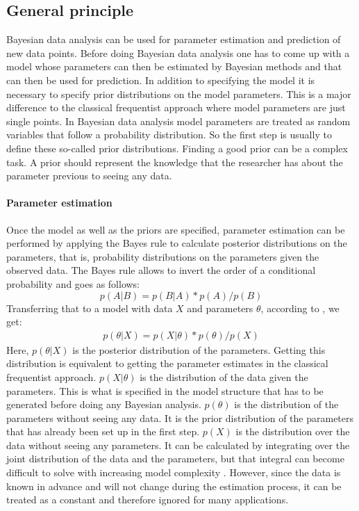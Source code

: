 \documentclass{article}
\begin{document}
\subsection{General principle}
\label{subsec: General principle}
Bayesian data analysis can be used for parameter estimation and prediction of new data points. Before doing Bayesian data analysis one has to come up with a model whose parameters can then be estimated by Bayesian methods and that can then be used for prediction. In addition to specifying the model it is necessary to specify prior distributions on the model parameters. This is a major difference to the classical frequentist approach where model parameters are just single points. In Bayesian data analysis model parameters are treated as random variables that follow a probability distribution. So the first step is usually to define these so-called prior distributions. Finding a good prior can be a complex task. A prior should represent the knowledge that the researcher has about the parameter previous to seeing any data.
\paragraph{Parameter estimation}
Once the model as well as the priors are specified, parameter estimation can be performed by applying the Bayes rule to calculate posterior distributions on the parameters, that is, probability distributions on the parameters given the observed data. The Bayes rule allows to invert the order of a conditional probability and goes as follows:
\begin{equation}
p(A|B) = p(B|A) * p(A)/p(B)
\end{equation}
Transferring that to a model with data $X$ and parameters $\theta$, according to \cite{1439840954}, we get:
\begin{equation}
\label{eq:Bayes_formula}
\begin{split}
p(\theta|X) = p(X|\theta) * p(\theta)/p(X)
\end{split}
\end{equation}
Here, $p(\theta|X)$ is the posterior distribution of the parameters. Getting this distribution is equivalent to getting the parameter estimates in the classical frequentist approach. $p(X|\theta)$ is the distribution of the data given the parameters. This is what is specified in the model structure that has to be generated before doing any Bayesian analysis. $p(\theta)$ is the distribution of the parameters without seeing any data. It is the prior distribution of the parameters that has already been set up in the first step. $p(X)$ is the distribution over the data without seeing any parameters. It can be calculated by integrating over the joint distribution of the data and the parameters, but that integral can become difficult to solve with increasing model complexity \cite{1439840954}. However, since the data is known in advance and will not change during the estimation process, it can be treated as a constant and therefore ignored for many applications.
\end{document}
